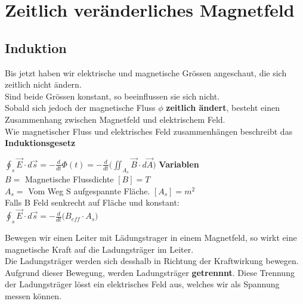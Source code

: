 



\newpage

\section{Zeitlich veränderliches Magnetfeld}

\subsection{Induktion}

Bis jetzt haben wir elektrische und magnetische Grössen angeschaut, die sich zeitlich nicht ändern. \\
Sind beide Grössen konstant, so beeinflussen sie sich nicht. \\
Sobald sich jedoch der magnetische Fluss $\phi$  \textbf{zeitlich ändert}, besteht einen Zusammenhang zwischen Magnetfeld und elektrischem Feld. \\
Wie magnetischer Fluss und elektrisches Feld zusammenhängen beschreibt das \textbf{Induktionsgesetz}


\begingl
\formulaBegin
$\displaystyle \oint_s \vec{E}\cdot d\vec{s} = -\frac{d}{dt}\Phi(t) =  -\frac{d}{dt} \big ( \iint_{A_s} \vec{B} \cdot d\vec{A} \big )$
\formulaEnd
\textbf{Variablen} \\
$B = $ Magnetische Flussdichte $[B] = T$\\
$A_s = $ Vom Weg S aufgespannte Fläche. $[A_s] = m^2$ \\

Falls B Feld senkrecht auf Fläche und konstant: \\

\formulaBegin
$\displaystyle  \oint_s \vec{E}\cdot d\vec{s} = -\frac{d}{dt} \big ( B_{eff} \cdot A_s \big ) $
\formulaEnd
\iend


\newpage

Bewegen wir einen Leiter mit Lädungstrager in einem Magnetfeld, so wirkt eine magnetische Kraft auf die Ladungsträger im Leiter. \\
Die Ladungsträger werden sich desshalb in Richtung der Kraftwirkung bewegen. \\
Aufgrund dieser Bewegung, werden Ladungsträger \textbf{getrennnt}. Diese Trennung der Ladungsträger lösst ein elektrisches Feld aus, welches wir als Spannung messen können.

